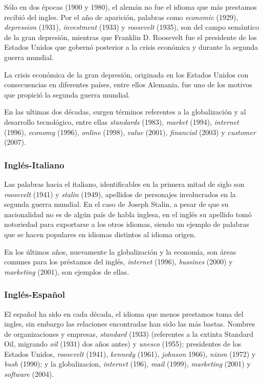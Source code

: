 Sólo  en dos épocas (1900  y 1980), el alemán no fue el idioma que más prestamos recibió  del ingles. Por el año de aparición, palabras como \textit{economic} (1929), \textit{depression} (1931), \textit{investment} (1933) y \textit{roosevelt} (1935), son del campo semántico de la gran depresión,  mientras que  Franklin D. Roosevelt fue el presidente de los Estados Unidos que gobernó posterior a la crisis económica y durante la segunda guerra mundial. 

La crisis económica de la gran depresión, originada en los Estados Unidos con consecuencias en diferentes países, entre ellos  Alemania, fue uno de los motivos que propició la segunda guerra mundial.

En las ultimas dos décadas, surgen términos referentes a la globalización y al desarrollo tecnológico, entre ellas \textit{standards} (1983), \textit{market} (1994), \textit{internet} (1996), \textit{economy} (1996), \textit{online} (1998), \textit{value} (2001), \textit{financial} (2003) y \textit{customer} (2007). 

\subsubsection*{Inglés-Italiano} %


Las palabras hacia el italiano, identificables en la primera mitad de siglo son \textit{roosevelt} (1941) y \textit{stalin} (1949), apellidos de personajes involucrados en la segunda guerra mundial. En el caso de Joseph Stalin, a pesar de que su nacionalidad no es de algún país de habla inglesa, en el inglés su apellido tomó notoriedad para exportarse a los otros idiomas, siendo un ejemplo de palabras que se hacen populares en idiomas distintos al idioma origen. 

En los últimos años, nuevamente la globalización y la economía, son áreas comunes para los préstamos del inglés, \textit{internet} (1996), \textit{bussines} (2000) y \textit{marketing} (2001), son ejemplos de ellas. 


\subsubsection*{Inglés-Español} 

El español ha sido en cada década,  el idioma que menos prestamos toma del ingles, sin embargo las relaciones encontradas han sido las más bastas.  Nombres de organizaciones y empresas,  \textit{standard} (1933) (referentes a la extinta Standard Oil, migrando \textit{oil} (1931) dos años antes) y \textit{unesco} (1955);  presidentes de los Estados Unidos,  \textit{roosevelt} (1941), \textit{kennedy} (1961), \textit{johnson} 1966),  \textit{nixon} (1972) y \textit{bush} (1990); y la globalizacion, \textit{internet} (196), \textit{mail} (1999), \textit{marketing} (2001) y \textit{software} (2004).   

